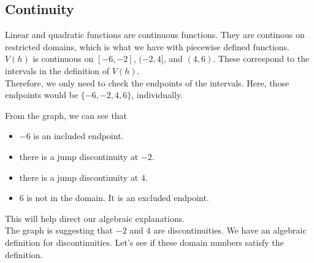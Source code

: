 \documentclass{ximera}
\begin{document}
\subsection*{Continuity} 


Linear and quadratic functions are continuous functions. They are continous on restricted domains, which is what we have with piecewise defined functions.  $V(h)$ is continuous on $[-6, -2]$, $(-2, 4]$, and $(4, 6)$.  These correspond to the intervals in the definition of $V(h)$. \\

Therefore, we only need to check the endpoints of the intervals.  Here, those endpoints would be $\{ -6, -2, 4, 6 \}$, individually.



\begin{observation} 
From the graph, we can see that 

\begin{itemize}
\item $-6$ is an included endpoint.  
\item there is a jump discontinuity at $-2$.
\item there is a jump discontinuity at $4$.
\item $6$ is not in the domain. It is an excluded endpoint.
\end{itemize}



\end{observation}


This will help direct our algebraic explanations. \\


The graph is suggesting that $-2$ and $4$ are discontinuities.  We have an algebraic definition for discontinuities.  Let's see if these domain numbers satisfy the definition. \\
\end{document}
